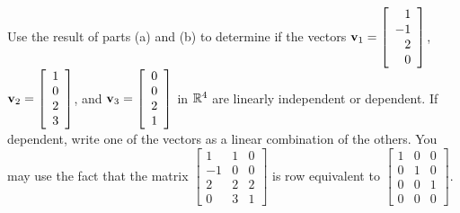 \begin{activity}
	\item Use the result of parts (a) and (b) to determine if the vectors $\mathbf{v}_1 = \left[ \begin{array}{r} 1 \\ -1 \\ 2 \\ 0 \end{array} \right]$, $\mathbf{v}_2 = \left[ \begin{array}{c} 1 \\ 0 \\ 2 \\ 3 \end{array} \right]$, and $\mathbf{v}_3 = \left[ \begin{array}{c} 0 \\ 0 \\ 2 \\ 1 \end{array} \right]$ in $\mathbb{R}^4$ are linearly independent or dependent. If dependent, write one of the vectors as a linear combination of the others. You may use the fact that the matrix $\left[ \begin{array}{rcc} 1&1&0 \\ -1&0&0 \\ 2&2&2 \\ 0&3&1 \end{array} \right]$ is row equivalent to $\left[ \begin{array}{rcc} 1&0&0 \\ 0&1&0 \\ 0&0&1 \\ 0&0&0 \end{array} \right]$.



\ea

\end{activity}


